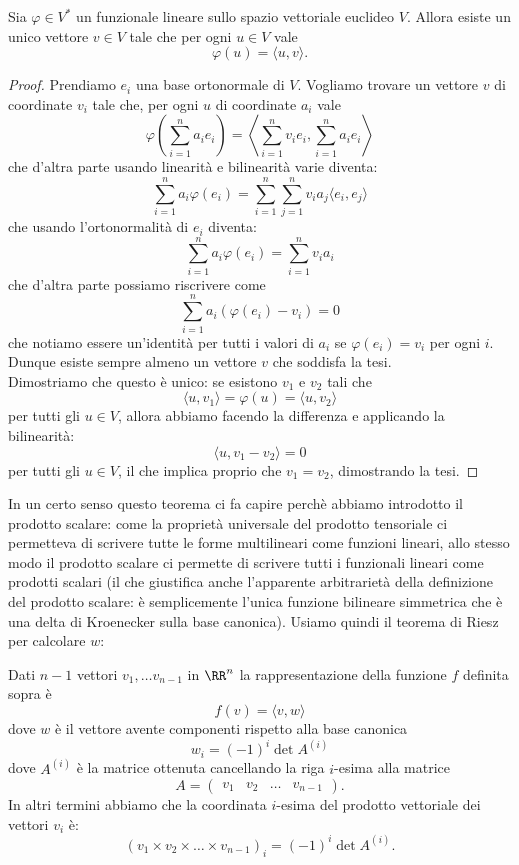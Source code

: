 \documentclass[11pt]{scrartcl}
\begin{document}
   	 \begin{theorem}
   	 	Sia $\varphi\in V^*$ un funzionale lineare sullo spazio vettoriale euclideo $V$. Allora esiste un unico vettore $v\in V$ tale che per ogni $u\in V$ vale
   	 	$$\varphi(u)=\langle u,v\rangle.$$ 
   	 \end{theorem}
   	 \begin{proof}
   	 	Prendiamo $e_i$ una base ortonormale di $V$. Vogliamo trovare un vettore $v$ di coordinate $v_i$ tale che, per ogni $u$ di coordinate $a_i$ vale
   	 	$$\varphi\left(\sum_{i=1}^{n}a_ie_i\right)=\left\langle \sum_{i=1}^{n}v_ie_i,\sum_{i=1}^{n}a_ie_i \right\rangle$$
   	 	che d'altra parte usando linearità e bilinearità varie diventa:
   	 	$$\sum_{i=1}^{n}a_i\varphi(e_i)=\sum_{i=1}^{n}\sum_{j=1}^{n}v_ia_j\langle e_i,e_j\rangle$$
   	 	che usando l'ortonormalità di $e_i$ diventa:
   	 	$$\sum_{i=1}^{n}a_i\varphi(e_i)=\sum_{i=1}^{n}v_ia_i$$
   	 	che d'altra parte possiamo riscrivere come
   	 	$$\sum_{i=1}^{n}a_i\left(\varphi(e_i)-v_i\right)=0$$
   	 	che notiamo essere un'identità per tutti i valori di $a_i$ se $\varphi(e_i)=v_i$ per ogni $i$. Dunque esiste sempre almeno un vettore $v$ che soddisfa la tesi. \\ Dimostriamo che questo è unico: se esistono $v_1$ e $v_2$ tali che 
   	 	$$\langle u,v_1 \rangle = \varphi(u) = \langle u,v_2 \rangle $$
   	 	per tutti gli $u\in V$, allora abbiamo facendo la differenza e applicando la bilinearità:
   	 	$$\langle u,v_1-v_2 \rangle =0$$
   	 	per tutti gli $u\in V$, il che implica proprio che $v_1=v_2$, dimostrando la tesi.
   	 \end{proof}
   	 In un certo senso questo teorema ci fa capire perchè abbiamo introdotto il prodotto scalare: come la proprietà universale del prodotto tensoriale ci permetteva di scrivere tutte le forme multilineari come funzioni lineari, allo stesso modo il prodotto scalare ci permette di scrivere tutti i funzionali lineari come prodotti scalari (il che giustifica anche l'apparente arbitrarietà della definizione del prodotto scalare: è semplicemente l'unica funzione bilineare simmetrica che è una delta di Kroenecker sulla base canonica). Usiamo quindi il teorema di Riesz per calcolare $w$:
   	 \begin{corollary}
   	 	Dati $n-1$ vettori $v_1,\dots v_{n-1}$ in $\RR^n$ la rappresentazione della funzione $f$ definita sopra è 
   	 	$$f(v)=\langle v,w\rangle$$
   	 	dove $w$ è il vettore avente componenti rispetto alla base canonica
   	 	$$w_i=(-1)^i\det A^{(i)}$$
   	 	dove $A^{(i)}$ è la matrice ottenuta cancellando la riga $i$-esima alla matrice 
   	 	$$A=
   	 	\left(
   	 	\begin{array}{c|c|c|c}
   	 		v_1 & v_2 & \dots & v_{n-1}
   	 	\end{array}
   	 	\right).
   	 	$$
   	 	In altri termini abbiamo che la coordinata $i$-esima del prodotto vettoriale dei vettori $v_i$ è:
   	 	$$\left(v_1\times v_2 \times \dots \times v_{n-1} \right)_i=(-1)^i\det A^{(i)}.$$
   	 \end{corollary}
\end{document}
